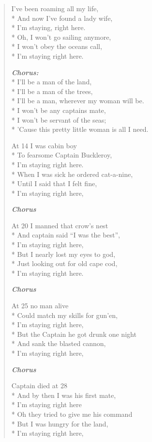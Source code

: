 \documentclass[9pt,twoside]{extarticle}
\newenvironment{xverse}{
	\begin{verse}
	\fontsize{8.5}{10.5}\selectfont
	}
	{
	\end{verse}
	\penalty 0
}
\newcommand{\chorusdef}{\textbf{\emph{Chorus:}}\\*}
\newcommand{\chorusmark}[1][1]{%
\vspace{-0.5\stanzaskip}%
\textbf{\emph{Chorus \ifthenelse{\equal{#1}{1}}{}{$\times$ #1}}}%
\vspace{-0.5\stanzaskip}%
}
\begin{document}
\begin{xverse}
I’ve been roaming all my life, \\*
And now I’ve found a lady wife, \\*
I’m staying, right here. \\*
Oh, I won’t go sailing anymore, \\*
I won’t obey the oceans call, \\*
I’m staying right here.

\chorusdef
I’ll be a man of the land, \\*
I’ll be a man of the trees, \\*
I’ll be a man, wherever my woman will be. \\*
I won’t be any captains mate, \\*
I won’t be servant of the seas; \\*
’Cause this pretty little woman is all I need.

At 14 I was cabin boy \\*
To fearsome Captain Buckleroy, \\*
I’m staying right here. \\*
When I was sick he ordered cat-a-nine, \\*
Until I said that I felt fine, \\*
I’m staying right here,

\chorusmark

At 20 I manned that crow’s nest \\*
And captain said “I was the best”, \\*
I’m staying right here, \\*
But I nearly lost my eyes to god, \\*
Just looking out for old cape cod, \\*
I’m staying right here.

\chorusmark

At 25 no man alive \\*
Could match my skills for gun’en, \\*
I’m staying right here, \\*
But the Captain he got drunk one night \\*
And sank the blasted cannon, \\*
I’m staying right here,

\chorusmark

Captain died at 28 \\*
And by then I was his first mate, \\*
I’m staying right here \\*
Oh they tried to give me his command \\*
But I was hungry for the land, \\*
I’m staying right here,


\end{xverse}
\end{document}
